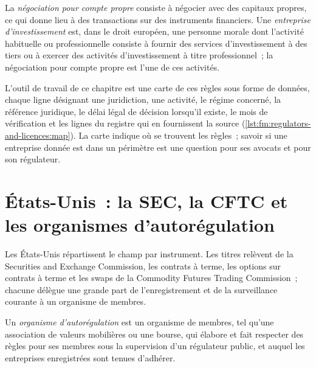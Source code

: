 \begin{definition}\label{def:fm:regulators-and-licences:own}
La \emph{négociation pour compte propre} consiste à négocier avec des capitaux propres, ce qui donne lieu à des
transactions sur des instruments financiers. Une \emph{entreprise d'investissement} est, dans le droit européen, une personne morale dont l'activité habituelle ou professionnelle consiste à fournir des services d'investissement à des tiers
ou à exercer des activités d'investissement à titre professionnel~; la négociation pour compte propre est l'une de ces
activités.
\end{definition}

L'outil de travail de ce chapitre est une carte de ces règles sous forme de données, chaque ligne désignant une juridiction, une activité, le régime concerné, la référence juridique,
le délai légal de décision lorsqu'il existe, le mois de vérification et les lignes du registre qui en fournissent la source
(\cref{lst:fm:regulators-and-licences:map}). La carte indique où se trouvent les règles~; savoir si une entreprise donnée est dans un périmètre est une
question pour ses avocats et pour son régulateur.

\label{lst:fm:regulators-and-licences:map}

\section{États-Unis~: la SEC, la CFTC et les organismes d'autorégulation}

Les États-Unis répartissent le champ par instrument. Les titres relèvent de la Securities and Exchange Commission, les contrats à terme, les options sur contrats à terme et les swaps
de la Commodity Futures Trading Commission~; chacune délègue une grande part de l'enregistrement et de la surveillance courante à un organisme de membres.

\begin{definition}\label{def:fm:regulators-and-licences:sro}
Un \emph{organisme d'autorégulation} est un organisme de membres, tel qu'une association de valeurs mobilières ou une bourse,
qui élabore et fait respecter des règles pour ses membres sous la supervision d'un régulateur public, et auquel les entreprises enregistrées sont tenues
d'adhérer.
\end{definition}

